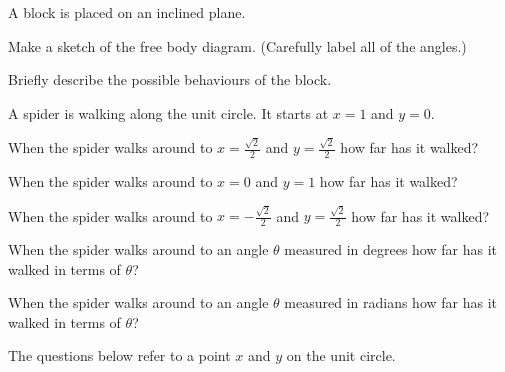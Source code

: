 \begin{problem}
\item A block is placed on an inclined plane.

  \scalebox{0.35}{}

  \begin{subproblem}
    \item Make a sketch of the free body diagram. (Carefully label all of the angles.)
      \vfill
      \vfill
    \item Briefly describe the possible behaviours of the block.
      \vfill
  \end{subproblem}

  \clearpage

\item A spider is walking along the unit circle. It starts at $x=1$
  and $y=0$.

  \scalebox{0.35}{}

  \begin{subproblem}
    \item When the spider walks around to $x=\frac{\sqrt{2}}{2}$ and
      $y=\frac{\sqrt{2}}{2}$ how far has it walked?
      \vfill
    \item When the spider walks around to $x=0$ and
      $y=1$ how far has it walked?
      \vfill
    \item When the spider walks around to $x=-\frac{\sqrt{2}}{2}$ and
      $y=\frac{\sqrt{2}}{2}$ how far has it walked?
      \vfill
    \item When the spider walks around to an angle $\theta$ measured
      in degrees how far has it walked in terms of $\theta$?
      \vfill
    \item When the spider walks around to an angle $\theta$ measured
      in radians how far has it walked in terms of $\theta$?
      \vfill
  \end{subproblem}

  \clearpage

\item The questions below refer to a point $x$ and $y$ on the unit circle.

  \scalebox{0.35}{}


\end{problem}
